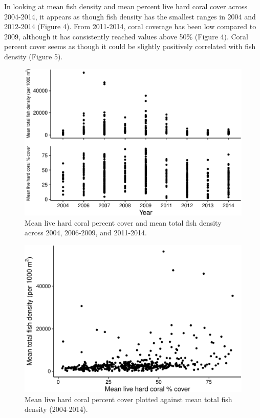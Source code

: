 \documentclass[12pt,]{article}
\begin{document}
\newpage

In looking at mean fish density and mean percent live hard coral cover
across 2004-2014, it appears as though fish density has the smallest
ranges in 2004 and 2012-2014 (Figure 4). From 2011-2014, coral coverage
has been low compared to 2009, although it has consistently reached
values above 50\% (Figure 4). Coral percent cover seems as though it
could be slightly positively correlated with fish density (Figure 5).

\begin{figure}

{\centering \includegraphics{Mullaney_ENV872_Project_files/figure-latex/Coral Fish Exploratory Plots-1} 

}

\caption{Mean live hard coral percent cover and mean total fish density across 2004, 2006-2009, and 2011-2014.}\label{fig:Coral Fish Exploratory Plots}
\end{figure}

\begin{figure}

{\centering \includegraphics{Mullaney_ENV872_Project_files/figure-latex/Coral Fish Scatter-1} 

}

\caption{Mean live hard coral percent cover plotted against mean total fish density (2004-2014).}\label{fig:Coral Fish Scatter}
\end{figure}
\end{document}
